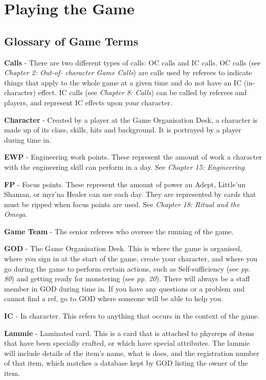 \part{Playing the Game}

\chapter{Glossary of Game Terms}

\textbf{Calls} - There are two different types of calls: OC calls and IC calls. OC calls (see \textit{Chapter 2: Out-of-} \textit{character Game Calls}) are calls used by referees to indicate things that apply to the whole game at a given time and do not have an IC (in-character) effect. IC calls (see \textit{Chapter 8: Calls}) can be called by referees and players, and represent IC effects upon your character.

\textbf{Character} - Created by a player at the Game Organisation Desk, a character is made up of its class, skills, hits and background. It is portrayed by a player during time in.

\textbf{EWP} - Engineering work points. These represent the amount of work a character with the engineering skill can perform in a day. See \textit{Chapter 15: Engineering}.

\textbf{FP} - Focus points. These represent the amount of power an Adept, Little'un Shaman, or myr'na Healer can use each day. They are represented by cards that must be ripped when focus points are used. See \textit{Chapter} \textit{18: Ritual and the Omega}.

\textbf{Game Team} - The senior referees who oversee the running of the game.

\textbf{GOD} - The Game Organisation Desk. This is where the game is organised, where you sign in at the start of the game, create your character, and where you go during the game to perform certain actions, such as Self-sufficiency (see \textit{pp. 80}) and getting ready for monstering (see \textit{pp. 20}). There will always be a staff member in GOD during time in. If you have any questions or a problem and cannot find a ref, go to GOD where someone will be able to help you.

\textbf{IC} - In character. This refers to anything that occurs in the context of the game.

\textbf{Lammie} - Laminated card. This is a card that is attached to physreps of items that have been specially crafted, or which have special attributes. The lammie will include details of the item's name, what is does, and the registration number of that item, which matches a database kept by GOD listing the owner of the item.

